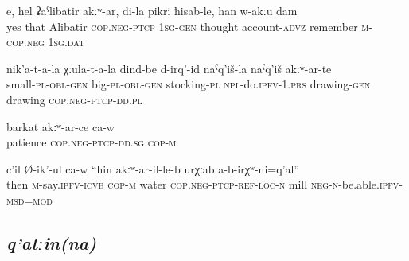 \begin{exe}
	\ex
	\begin{xlist}
		\ex	\label{Yes, except Alibatir, in my mind, I do not remember}
		\gll	e,	hel	ʡaˁlibatir	akːʷ-ar,	di-la	pikri	ħisab-le,	han	w-akːu	dam   \\
			yes	that	Alibatir	\textsc{cop.neg}-\textsc{ptcp}	1\textsc{sg}-\textsc{gen}	thought	account-\textsc{advz}	remember	\textsc{m}-\textsc{cop.neg}	1\textsc{sg.}\textsc{dat}\\
		\glt	{}

		\ex	\label{For children, for adults we make stockings, those with a drawing, those without a drawing}
		\gll	nik'a-t-a-la	χːula-t-a-la	dind-be	d-irq'-id	naˁq'iš-la	naˁq'iš	akːʷ-ar-te \\
			small-\textsc{pl}-\textsc{obl}-\textsc{gen}	big-\textsc{pl}-\textsc{obl}-\textsc{gen}	stocking-\textsc{pl}	\textsc{npl}-do.\textsc{ipfv}-1.\textsc{prs}	drawing-\textsc{gen} drawing	\textsc{cop.neg}-\textsc{ptcp}-\textsc{dd.pl }\\
		\glt	{}

		\ex	\label{(He) lacks patience}
		\gll	barkat	akːʷ-ar-ce	ca-w  \\
			patience	\textsc{cop.neg}-\textsc{ptcp}-\textsc{dd}.\textsc{sg}	\textsc{cop-m}\\
		\glt	{}

		\ex	\label{‎‎He said, there where is no water a mill cannot be}
		\gll	c'il	Ø-ik'-ul ca-w		``hin	akːʷ-ar-il-le-b	urχːab	a-b-irχʷ-ni=q'al''  \\
			then	\textsc{m}-say.\textsc{ipfv}-\textsc{icvb} \textsc{cop-m} water \textsc{cop.neg}-\textsc{ptcp}-\textsc{ref}-\textsc{loc}-\textsc{n}	mill	\textsc{neg}-\textsc{n}-be.able.\textsc{ipfv}-\textsc{msd}=\textsc{mod}\\
		\glt	{}
	\end{xlist}
\end{exe}



\subsection{\textit{q'atːin(na)} }
\label{ssec:postposition qatinna}

